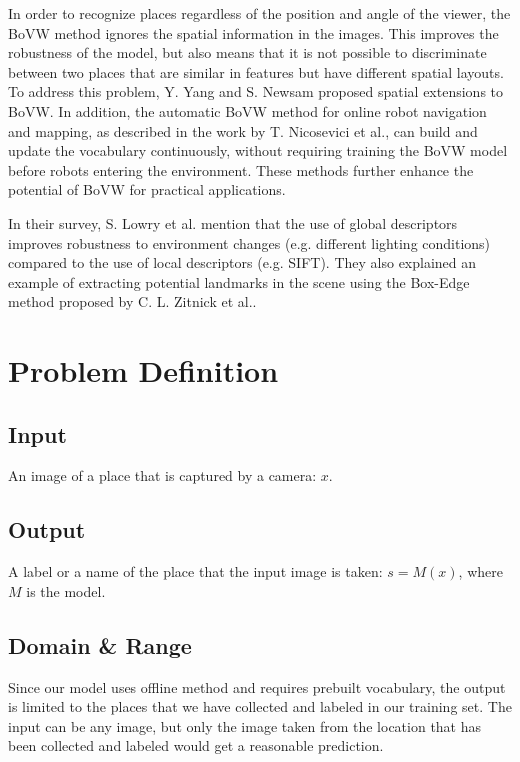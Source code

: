 \documentclass[conference]{IEEEtran}
\begin{document}
In order to recognize places regardless of the position and angle of the viewer, the BoVW method ignores the spatial information in the images\cite{lowry2015visual}. This improves the robustness of the model, but also means that it is not possible to discriminate between two places that are similar in features but have different spatial layouts. To address this problem, Y. Yang and S. Newsam\cite{yang2010bag} proposed spatial extensions to BoVW. In addition, the automatic BoVW method for online robot navigation and mapping, as described in the work by T. Nicosevici et al.\cite{nicosevici2012automatic}, can build and update the vocabulary continuously, without requiring training the BoVW model before robots entering the environment. These methods further enhance the potential of BoVW for practical applications.

In their survey, S. Lowry et al.\cite{lowry2015visual} mention that the use of global descriptors improves robustness to environment changes (e.g. different lighting conditions) compared to the use of local descriptors (e.g. SIFT). They also explained an example of extracting potential landmarks in the scene using the Box-Edge method proposed by C. L. Zitnick et al.\cite{zitnick2014edge}.

\section{Problem Definition}

\subsection{Input}

An image of a place that is captured by a camera: $x$.

\subsection{Output}

A label or a name of the place that the input image is taken: $s = M(x)$, where $M$ is the model.

\subsection{Domain \& Range}

Since our model uses offline method and requires prebuilt vocabulary, the output is limited to the places that we have collected and labeled in our training set. The input can be any image, but only the image taken from the location that has been collected and labeled would get a reasonable prediction.
\end{document}
